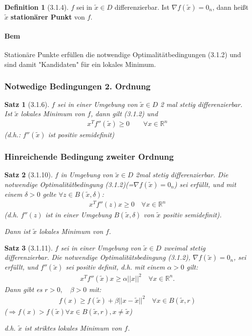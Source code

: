 \documentclass[ngerman,halfparskip]{scrartcl}
\newtheorem*{satz}{Satz}
\theoremstyle{definition}
\newtheorem*{defin}{Definition}
\newcommand*{\R}{\mathbb{R}}      %
\begin{document}
\begin{defin}[3.1.4]  $f$ sei in $\tilde x \in D $ differenzierbar. Ist $\nabla f(\tilde x)=0_n$, dann heißt $\tilde x$ \textbf{stationärer Punkt} von $f$.
\end{defin}
\paragraph{Bem} Stationäre Punkte erfüllen die notwendige Optimalitätbedingungen (3.1.2) und sind damit "Kandidaten" für ein lokales Minimum.
\subsubsection{Notwedige Bedingungen 2. Ordnung}
\begin{satz}[3.1.6] $f$ sei in einer Umgebung von $\tilde x \in D$ 2 mal stetig differenzierbar. Ist $\tilde x$ lokales Minimum von $f$, dann gilt (3.1.2) und 
\begin{gather}\tag{3.1.3} x^Tf''(\tilde x)\geq 0 \qquad \forall x\in\R^n
\end{gather}
(d.h.: $f''(\tilde x)$ ist positiv semidefinit)
\end{satz}

\subsubsection{Hinreichende Bedingung zweiter Ordnung}
\begin{satz}[3.1.10] $f$ in Umgebung von $\tilde x \in D$ 2mal stetig differenzierbar. Die notwendige Optimalitätbedingung (3.1.2)(=$\nabla f(\tilde x)=0_n$) sei erfüllt, und mit einem $\delta >0$ gelte $\forall z\in B(\tilde x, \delta)$:
\begin{gather}\tag{3.1.4} x^Tf''(z)x \geq 0 \quad \forall x\in\R^n\end{gather} (d.h. $f''(z)$ ist in einer Umgebung $B(\tilde x, \delta)$ von $\tilde x$ positiv semidefinit). 

Dann ist $\tilde x$ lokales Minimum von $f$.
\end{satz}

\begin{satz}[3.1.11] $ f $ sei in einer Umgebung von $ \tilde x \in D $ zweimal stetig differenzierbar. Die notwendige Optimalitätsbedingung (3.1.2), $ \nabla f(\tilde x)=0_n $, sei erfüllt, und $ f''(\tilde{x}) $ sei positiv definit, d.h. mit einem $ \alpha > 0 $ gilt:
\begin{gather}\tag{3.1.5} x^Tf''(\tilde x )x \geq \alpha ||x||^2\quad \forall x \in \R^n.\end{gather}
Dann gibt es $ r>0, \quad \beta >0 $ mit: 
\begin{gather*} f(x)\geq f(\tilde x)+\beta ||x-\tilde x||^2 \quad \forall x\in B(\tilde x, r)\end{gather*}
($ \Rightarrow f(x)> f(\tilde x) \forall x \in  B(\tilde x, r), x\neq\tilde x$)

d.h. $ \tilde x $ ist striktes lokales Minimum von $ f $.
\end{satz}
\end{document}
